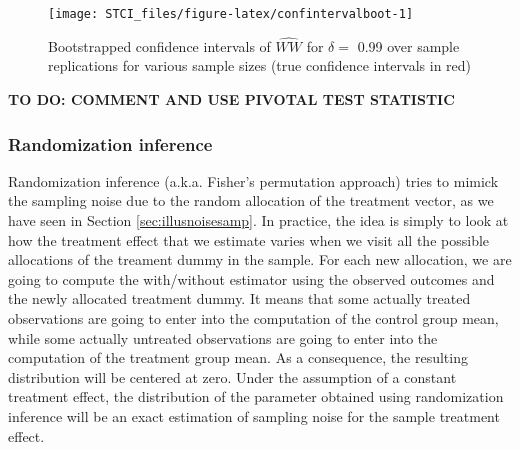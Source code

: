 \documentclass[]{book}
\newenvironment{Shaded}{\begin{snugshade}}{\end{snugshade}}
\newcommand{\DataTypeTok}[1]{\textcolor[rgb]{0.13,0.29,0.53}{#1}}
\newcommand{\DecValTok}[1]{\textcolor[rgb]{0.00,0.00,0.81}{#1}}
\newcommand{\KeywordTok}[1]{\textcolor[rgb]{0.13,0.29,0.53}{\textbf{#1}}}
\newcommand{\NormalTok}[1]{#1}
\newcommand{\OperatorTok}[1]{\textcolor[rgb]{0.81,0.36,0.00}{\textbf{#1}}}
\newcommand{\StringTok}[1]{\textcolor[rgb]{0.31,0.60,0.02}{#1}}
\theoremstyle{definition}
\theoremstyle{definition}
\theoremstyle{definition}
\theoremstyle{remark}
\begin{document}
\begin{Shaded}
\end{Shaded}

\begin{figure}[htbp]

{\centering \texttt{[image: STCI\_files/figure-latex/confintervalboot-1]} 

}

\caption{Bootstrapped confidence intervals of $\hat{WW}$ for $\delta=$ 0.99 over sample replications for various sample sizes (true confidence intervals in red)}\label{fig:confintervalboot}
\end{figure}

\textbf{TO DO: COMMENT AND USE PIVOTAL TEST STATISTIC}

\hypertarget{randomization-inference}{%
\subsubsection{Randomization inference}\label{randomization-inference}}

Randomization inference (a.k.a. Fisher's permutation approach) tries to mimick the sampling noise due to the random allocation of the treatment vector, as we have seen in Section \ref{sec:illusnoisesamp}.
In practice, the idea is simply to look at how the treatment effect that we estimate varies when we visit all the possible allocations of the treament dummy in the sample.
For each new allocation, we are going to compute the with/without estimator using the observed outcomes and the newly allocated treatment dummy.
It means that some actually treated observations are going to enter into the computation of the control group mean, while some actually untreated observations are going to enter into the computation of the treatment group mean.
As a consequence, the resulting distribution will be centered at zero.
Under the assumption of a constant treatment effect, the distribution of the parameter obtained using randomization inference will be an exact estimation of sampling noise for the sample treatment effect.
\end{document}
